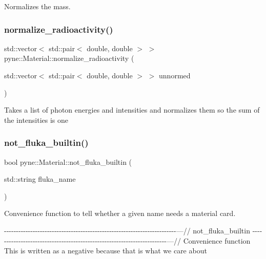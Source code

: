 Normalizes the mass. \mbox{\label{classpyne_1_1_material_a114deb10e8d118bbd37ade0fbce5253d}} 
\subsubsection{\texorpdfstring{normalize\+\_\+radioactivity()}{normalize\_radioactivity()}}
{\footnotesize\ttfamily std\+::vector$<$ std\+::pair$<$ double, double $>$ $>$ pyne\+::\+Material\+::normalize\+\_\+radioactivity (\begin{DoxyParamCaption}\item[{std\+::vector$<$ std\+::pair$<$ double, double $>$ $>$}]{unnormed }\end{DoxyParamCaption})}

Takes a list of photon energies and intensities and normalizes them so the sum of the intensities is one \mbox{\label{classpyne_1_1_material_a97461e1c6a87d91ed1293adbe43cb29e}} 
\subsubsection{\texorpdfstring{not\+\_\+fluka\+\_\+builtin()}{not\_fluka\_builtin()}}
{\footnotesize\ttfamily bool pyne\+::\+Material\+::not\+\_\+fluka\+\_\+builtin (\begin{DoxyParamCaption}\item[{std\+::string}]{fluka\+\_\+name }\end{DoxyParamCaption})}



Convenience function to tell whether a given name needs a material card. 

-\/-\/-\/-\/-\/-\/-\/-\/-\/-\/-\/-\/-\/-\/-\/-\/-\/-\/-\/-\/-\/-\/-\/-\/-\/-\/-\/-\/-\/-\/-\/-\/-\/-\/-\/-\/-\/-\/-\/-\/-\/-\/-\/-\/-\/-\/-\/-\/-\/-\/-\/-\/-\/-\/-\/-\/-\/-\/-\/-\/-\/-\/-\/-\/-\/-\/-\/-\/-\/-\/-\/-\/---// not\+\_\+fluka\+\_\+builtin -\/-\/-\/-\/-\/-\/-\/-\/-\/-\/-\/-\/-\/-\/-\/-\/-\/-\/-\/-\/-\/-\/-\/-\/-\/-\/-\/-\/-\/-\/-\/-\/-\/-\/-\/-\/-\/-\/-\/-\/-\/-\/-\/-\/-\/-\/-\/-\/-\/-\/-\/-\/-\/-\/-\/-\/-\/-\/-\/-\/-\/-\/-\/-\/-\/-\/-\/-\/-\/-\/-\/-\/---// Convenience function This is written as a negative because that is what we care about \mbox{\label{classpyne_1_1_material_a25bb43110ee9bd275cbe534c95713acc}} 
